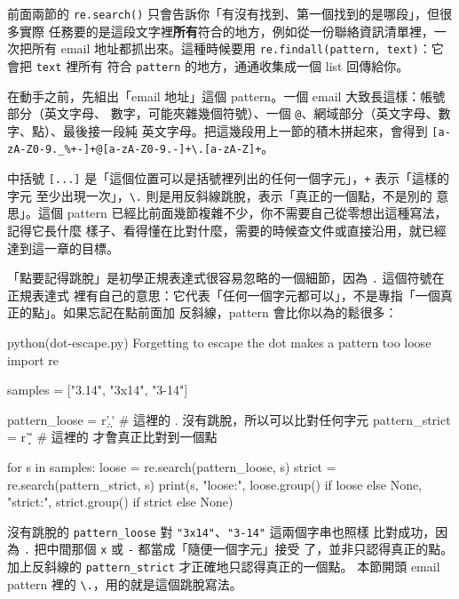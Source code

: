 前面兩節的 \texttt{re.search()} 只會告訴你「有沒有找到、第一個找到的是哪段」，但很多實際
任務要的是這段文字裡\textbf{所有}符合的地方，例如從一份聯絡資訊清單裡，一次把所有 email
地址都抓出來。這種時候要用 \texttt{re.findall(pattern, text)}：它會把 \texttt{text} 裡所有
符合 \texttt{pattern} 的地方，通通收集成一個 list 回傳給你。

在動手之前，先組出「email 地址」這個 pattern。一個 email 大致長這樣：帳號部分（英文字母、
數字，可能夾雜幾個符號）、一個 \texttt{@}、網域部分（英文字母、數字、點）、最後接一段純
英文字母。把這幾段用上一節的積木拼起來，會得到
\texttt{[a-zA-Z0-9.\_\%+-]+@[a-zA-Z0-9.-]+\textbackslash.[a-zA-Z]+}。

中括號
\texttt{[...]} 是「這個位置可以是括號裡列出的任何一個字元」，\texttt{+} 表示「這樣的字元
至少出現一次」，\texttt{\textbackslash.} 則是用反斜線跳脫，表示「真正的一個點，不是別的
意思」。這個 pattern 已經比前面幾節複雜不少，你不需要自己從零想出這種寫法，記得它長什麼
樣子、看得懂在比對什麼，需要的時候查文件或直接沿用，就已經達到這一章的目標。

「點要記得跳脫」是初學正規表達式很容易忽略的一個細節，因為 \texttt{.} 這個符號在正規表達式
裡有自己的意思：它代表「任何一個字元都可以」，不是專指「一個真正的點」。如果忘記在點前面加
反斜線，pattern 會比你以為的鬆很多：

\begin{example}{python}{(dot-escape.py) Forgetting to escape the dot makes a pattern too loose}
import re

samples = ["3.14", "3x14", "3-14"]

pattern_loose = r'\d.\d'    # 這裡的 . 沒有跳脫，所以可以比對任何字元
pattern_strict = r'\d\.\d'  # 這裡的 \. 才會真正比對到一個點

for s in samples:
    loose = re.search(pattern_loose, s)
    strict = re.search(pattern_strict, s)
    print(s, "loose:", loose.group() if loose else None,
          "strict:", strict.group() if strict else None)
\end{example}


沒有跳脫的 \texttt{pattern\_loose} 對 \texttt{"3x14"}、\texttt{"3-14"} 這兩個字串也照樣
比對成功，因為 \texttt{.} 把中間那個 \texttt{x} 或 \texttt{-} 都當成「隨便一個字元」接受
了，並非只認得真正的點。加上反斜線的 \texttt{pattern\_strict} 才正確地只認得真正的一個點。
本節開頭 email pattern 裡的 \texttt{\textbackslash.}，用的就是這個跳脫寫法。

